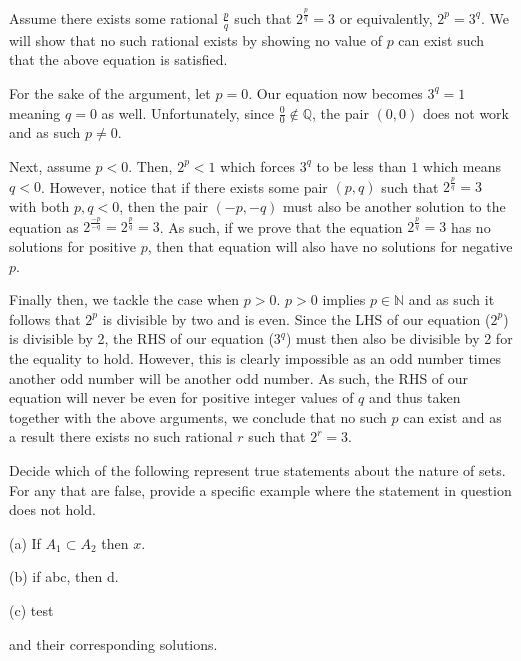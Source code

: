 \documentclass[../analysis_notes.tex]{subfiles}
\begin{document}
\begin{solution}
    Assume there exists some rational $\frac{p}{q}$ such that $2^{\frac{p}{q}} = 3$ or equivalently, $2^p = 3^q$. We will show that no such rational exists by showing no value of $p$ can exist such that the above equation is satisfied.

    For the sake of the argument, let $p = 0$. Our equation now becomes $3^q = 1$ meaning $q = 0$ as well. Unfortunately, since $\frac{0}{0} \not \in \mathbb{Q}$, the pair $(0, 0)$ does not work and as such $p \not = 0$.

    Next, assume $p < 0$. Then, $2^p < 1$ which forces $3^q$ to be less than $1$ which means $q < 0$. However, notice that if there exists some pair $(p, q)$ such that $2^{\frac{p}{q}} = 3$ with both $p, q < 0$, then the pair $(-p, -q)$ must also be another solution to the equation as $2^{\frac{-p}{-q}} = 2^{\frac{p}{q}} = 3$. As such, if we prove that the equation $2^{\frac{p}{q}} = 3$ has no solutions for positive $p$, then that equation will also have no solutions for negative $p$.

    Finally then, we tackle the case when $p > 0$. $p > 0$ implies $p \in \mathbb{N}$ and as such it follows that $2^p$ is divisible by two and is even. Since the LHS of our equation ($2^p$) is divisible by 2, the RHS of our equation ($3^q$) must then also be divisible by 2 for the equality to hold. However, this is clearly impossible as an odd number times another odd number will be another odd number. As such, the RHS of our equation will never be even for positive integer values of $q$ and thus taken together with the above arguments, we conclude that no such $p$ can exist and as a result there exists no such rational $r$ such that $2^r = 3$.
\end{solution}




\begin{exercise}
    Decide which of the following represent true statements about the nature of sets. For any that are false, provide a specific example where the statement in question does not hold.

    (a) If \( A_{1} \subset A_{2} \) then \( x \).

    (b) if abc, then d.     

    (c) test
\end{exercise}

\begin{solution}
    and their corresponding solutions.
\end{solution}
\end{document}
